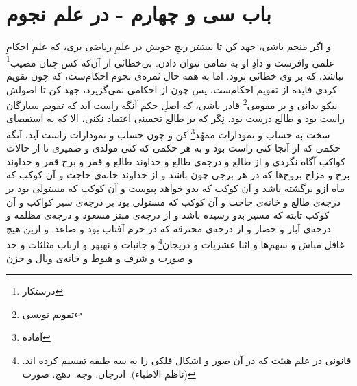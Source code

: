 \section*{باب سى و چهارم - 
در علم نجوم}

و اگر منجم باشى، جهد كن تا بيشتر رنجِ خويش در علمِ رياضى برى، كه علمِ احكامِ علمى وافرست و  دادِ او به تمامى نتوان دادن. بى‌خطائى از آن‌كه كس چنان مصيب\footnote{درستکار} نباشد، كه بر وى خطائى نرود. اما به همه حال ثمره‌ی نجوم احكام‌ست، كه چون تقويم كردى فايده از تقويم احكام‌ست، پس چون از احكامى نمى‌گزيرد، جهد كن تا اصولش نيكو بدانى و بر مقومى\footnote{تقویم نویسی} قادر باشى، كه اصلِ حكم آنگه راست آيد كه تقويم سيارگان راست بود و طالع درست بود. نِگر كه بر طالع تخمينى اعتماد نكنى، الا كه به استقصاى سخت به حساب و نمودارات ممهّد\footnote{آماده} كن و چون حساب و نمودارات راست آيد، آنگه حكمى كه از آنجا كنى راست بود و به هر حكمى كه كنى مولدى و ضميرى تا از حالات كواكب آگاه نگردى و از طالع و درجه‌ی طالع و خداوند طالع و قمر و برج قمر و خداوند برج و مزاج بروج‌ها كه در هر برجى چون باشد و از خداوند خانه‌ی حاجت و آن كوكب كه ماه ازو برگشته باشد و آن كوكب كه بدو خواهد پيوست و آن كوكب كه مستولى بود بر درجه‌ی طالع و خانه‌ی حاجت و آن كوكب كه مستولى بود بر درجه‌ی سير كواكب و آن كوكب ثابته كه مسير بدو رسيده باشد و از درجه‌ی مبتز مسعود و درجه‌ی مظلمه و درجه‌ی آبار و حصار و از درجه‌ی محترقه كه در حرم آفتاب بود و صاعد. و ازين هيچ غافل مباش و سهم‌ها و اثنا عشريات و دريجان\footnote{قانونی در علم هیئت که در آن صور و اشکال فلکی را به سه طبقه تقسیم کرده اند. (ناظم الاطباء). ادرجان. وجه. دهج. صورت} و جانبات و نهبهر و ارباب مثلثات و حد و صورت و شرف و هبوط و خانه‌ی وبال و حزن 
